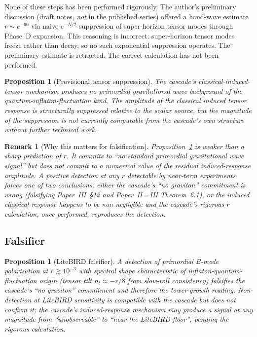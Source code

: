 \documentclass[12pt,a4paper]{article}
\newtheorem{proposition}[theorem]{Proposition}
\newtheorem*{remark}{Remark}
\begin{document}
None of these steps has been performed rigorously. The author's preliminary
discussion (draft notes, \emph{not} in the published series) offered a
hand-wave estimate $r \sim e^{-60}$ via naive $e^{-N/2}$ suppression of
super-horizon tensor modes through Phase~D expansion. This reasoning is
incorrect: super-horizon tensor modes freeze rather than decay, so no such
exponential suppression operates. The preliminary estimate is retracted. The
correct calculation has not been performed.

\begin{proposition}[Provisional tensor suppression]\label{prop:tensor-provisional}
The cascade's classical-induced-tensor mechanism produces no primordial
gravitational-wave background of the quantum-inflaton-fluctuation kind. The
amplitude of the classical induced tensor response is structurally suppressed
relative to the scalar source, but the magnitude of the suppression is not
currently computable from the cascade's own structure without further
technical work.
\end{proposition}

\begin{remark}[Why this matters for falsification]
Proposition~\ref{prop:tensor-provisional} is weaker than a sharp prediction of
$r$. It commits to ``no standard primordial gravitational wave signal'' but
does not commit to a numerical value of the residual induced-response
amplitude. A positive detection at any $r$ detectable by near-term experiments
forces one of two conclusions: either the cascade's ``no graviton'' commitment
is wrong (falsifying Paper~III~\S12 and Paper~II\,=\,III Theorem~6.1), or the
induced classical response happens to be non-negligible and the cascade's
rigorous $r$ calculation, once performed, reproduces the detection.
\end{remark}

\subsection{Falsifier}

\begin{proposition}[LiteBIRD falsifier]\label{prop:litebird}
A detection of primordial B-mode polarisation at $r \gtrsim 10^{-3}$ with
spectral shape characteristic of inflaton-quantum-fluctuation origin
(tensor tilt $n_t \approx -r/8$ from slow-roll consistency) falsifies the
cascade's ``no graviton'' commitment and therefore the tower-growth reading.
Non-detection at LiteBIRD sensitivity is compatible with the cascade but does
not confirm it; the cascade's induced-response mechanism may produce a signal
at any magnitude from ``unobservable'' to ``near the LiteBIRD floor'',
pending the rigorous calculation.
\end{proposition}
\end{document}
